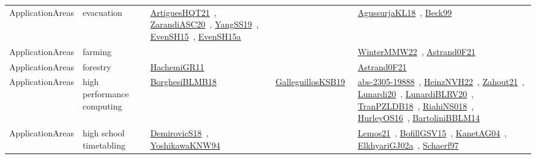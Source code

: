 {\begin{longtable}{lp{3cm}>{\raggedright\arraybackslash}p{6cm}>{\raggedright\arraybackslash}p{6cm}>{\raggedright\arraybackslash}p{8cm}}
\index{evacuation}\index{ApplicationAreas!evacuation}ApplicationAreas & evacuation & \href{../works/ArtiguesHQT21.pdf}{ArtiguesHQT21}~\cite{ArtiguesHQT21}, \href{../works/ZarandiASC20.pdf}{ZarandiASC20}~\cite{ZarandiASC20}, \href{../works/YangSS19.pdf}{YangSS19}~\cite{YangSS19}, \href{../works/EvenSH15.pdf}{EvenSH15}~\cite{EvenSH15}, \href{../works/EvenSH15a.pdf}{EvenSH15a}~\cite{EvenSH15a} &  & \href{../works/AgussurjaKL18.pdf}{AgussurjaKL18}~\cite{AgussurjaKL18}, \href{../works/Beck99.pdf}{Beck99}~\cite{Beck99}\\
\index{farming}\index{ApplicationAreas!farming}ApplicationAreas & farming &  &  & \href{../works/WinterMMW22.pdf}{WinterMMW22}~\cite{WinterMMW22}, \href{../works/Astrand0F21.pdf}{Astrand0F21}~\cite{Astrand0F21}\\
\index{forestry}\index{ApplicationAreas!forestry}ApplicationAreas & forestry & \href{../works/HachemiGR11.pdf}{HachemiGR11}~\cite{HachemiGR11} &  & \href{../works/Astrand0F21.pdf}{Astrand0F21}~\cite{Astrand0F21}\\
\index{high performance computing}\index{ApplicationAreas!high performance computing}ApplicationAreas & high performance computing & \href{../works/BorghesiBLMB18.pdf}{BorghesiBLMB18}~\cite{BorghesiBLMB18} & \href{../works/GalleguillosKSB19.pdf}{GalleguillosKSB19}~\cite{GalleguillosKSB19} & \href{../works/abs-2305-19888.pdf}{abs-2305-19888}~\cite{abs-2305-19888}, \href{../works/HeinzNVH22.pdf}{HeinzNVH22}~\cite{HeinzNVH22}, \href{../works/Zahout21.pdf}{Zahout21}~\cite{Zahout21}, \href{../works/Lunardi20.pdf}{Lunardi20}~\cite{Lunardi20}, \href{../works/LunardiBLRV20.pdf}{LunardiBLRV20}~\cite{LunardiBLRV20}, \href{../works/TranPZLDB18.pdf}{TranPZLDB18}~\cite{TranPZLDB18}, \href{../works/RiahiNS018.pdf}{RiahiNS018}~\cite{RiahiNS018}, \href{../works/HurleyOS16.pdf}{HurleyOS16}~\cite{HurleyOS16}, \href{../works/BartoliniBBLM14.pdf}{BartoliniBBLM14}~\cite{BartoliniBBLM14}\\
\index{high school timetabling}\index{ApplicationAreas!high school timetabling}ApplicationAreas & high school timetabling & \href{../works/DemirovicS18.pdf}{DemirovicS18}~\cite{DemirovicS18}, \href{../works/YoshikawaKNW94.pdf}{YoshikawaKNW94}~\cite{YoshikawaKNW94} &  & \href{../works/Lemos21.pdf}{Lemos21}~\cite{Lemos21}, \href{../works/BofillGSV15.pdf}{BofillGSV15}~\cite{BofillGSV15}, \href{../works/KanetAG04.pdf}{KanetAG04}~\cite{KanetAG04}, \href{../works/ElkhyariGJ02a.pdf}{ElkhyariGJ02a}~\cite{ElkhyariGJ02a}, \href{../works/Schaerf97.pdf}{Schaerf97}~\cite{Schaerf97}\\

\end{longtable}}
